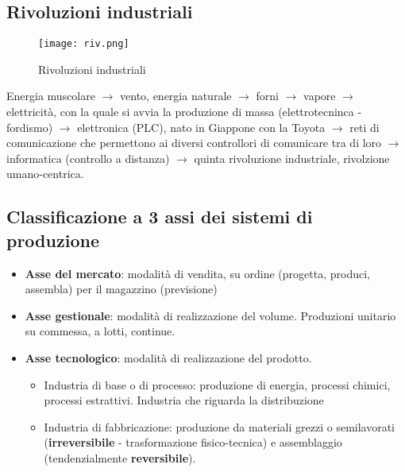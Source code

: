 \documentclass[../main.tex]{subfiles}
\begin{document}
\subsection{Rivoluzioni industriali}
\begin{figure}[h!]
    \centering
    \texttt{[image: riv.png]}
    \caption{Rivoluzioni industriali}
\end{figure}
Energia muscolare $\rightarrow$ vento, energia naturale $\rightarrow$ forni $\rightarrow$ vapore $\rightarrow$ elettricità, con la quale si avvia la produzione di massa (elettrotecninca - fordismo) $\rightarrow$ elettronica (PLC), nato in Giappone con la Toyota $\rightarrow$ reti di comunicazione che permettono ai diversi controllori di comunicare tra di loro $\rightarrow$ informatica (controllo a distanza) $\rightarrow$ quinta rivoluzione industriale, rivolzione umano-centrica.

\subsection*{Classificazione a 3 assi dei sistemi di produzione}
\begin{itemize}
    \item \textbf{Asse del mercato}: modalità di vendita, su ordine (progetta, produci, assembla) per il magazzino (previsione)
    \item \textbf{Asse gestionale}: modalità di realizzazione del volume. Produzioni unitario su commessa, a lotti, continue. 
    \item \textbf{Asse tecnologico}: modalità di realizzazione del prodotto. \begin{itemize}
        \item Industria di base o di processo: produzione di energia, processi chimici, processi estrattivi. Industria che riguarda la distribuzione
        \item Industria di fabbricazione: produzione da materiali grezzi o semilavorati (\textbf{irreversibile} - trasformazione fisico-tecnica) e assemblaggio (tendenzialmente \textbf{reversibile}).
    \end{itemize}
\end{itemize}
\end{document}

